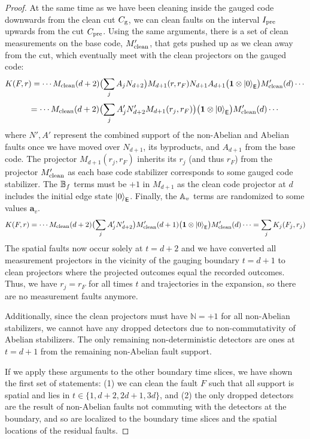 \documentclass[11pt]{article}
\begin{document}
\begin{proof}
    At the same time as we have been cleaning inside the gauged code downwards from the clean cut $C_{\rm g}$, we can clean faults on the interval $I_{\rm pre}$ upwards from the cut $C_{\rm pre}$. Using the same arguments, there is a set of clean measurements on the base code, $M'_{\rm clean}$, that gets pushed up as we clean away from the cut, which eventually meet with the clean projectors on the gauged code:
    \[
    K(F, r) = \cdots M_{\rm clean}(d+2) \bigl ( \sum_j A_j N_{d+2} \bigr ) M_{d+1}(r, r_F) N_{d+1} A_{d+1} \bigl ( \mathbf{1} \otimes \ket{0}_{\mathsf{E}}  \bigr ) M'_{\rm clean}(d) \cdots 
    \]
    \[
    = \cdots M_{\rm clean}(d+2) \bigl ( \sum_j A'_j N'_{d+2} M_{d+1}(r_j, r_F) \bigr ) \bigl ( \mathbf{1} \otimes \ket{0}_{\mathsf{E}}  \bigr ) M'_{\rm clean}(d) \cdots 
    \]
    where $N', A'$ represent the combined support of the non-Abelian and Abelian faults once we have moved over $N_{d+1}$, its byproducts, and $A_{d+1}$ from the base code. The projector $M_{d+1}(r_j, r_F)$ inherits its $r_j$ (and thus $r_F$) from the projector $M'_{\rm clean}$ as each base code stabilizer corresponds to some gauged code stabilizer. The $\mathbb{B}_f$ terms must be $+1$ in $M_{d+1}$ as the clean code projector at $d$ includes the initial edge state $\ket{0}_{\mathsf{E}}$. Finally, the $\mathbb{A}_v$ terms are randomized to some values $\bm a_v$.
    \[
    K(F, r) = \cdots M_{\rm clean}(d+2) \bigl ( \sum_j A'_j N'_{d+2} \bigr ) M'_{\rm clean}(d+1) \bigl ( \mathbf{1} \otimes \ket{0}_{\mathsf{E}}  \bigr ) M'_{\rm clean}(d) \cdots = \sum_j K_j(F_j, r_j) 
    \]
    The spatial faults now occur solely at $t = d+2$ and we have converted all measurement projectors in the vicinity of the gauging boundary $t=d+1$ to clean projectors where the projected outcomes equal the recorded outcomes. Thus, we have $r_j = r_F$ for all times $t$ and trajectories in the expansion, so there are no measurement faults anymore. 

    Additionally, since the clean projectors must have $\mathbb{N} = +1$ for all non-Abelian stabilizers, we cannot have any dropped detectors due to non-commutativity of Abelian stabilizers. The only remaining non-deterministic detectors are ones at $t=d+1$ from the remaining non-Abelian fault support.

    If we apply these arguments to the other boundary time slices, we have shown the first set of statements: (1) we can clean the fault $F$ such that all support is spatial and lies in $t \in \{1, d+2, 2d+1, 3d\}$, and (2) the only dropped detectors are the result of non-Abelian faults not commuting with the detectors at the boundary, and so are localized to the boundary time slices and the spatial locations of the residual faults. 


\end{proof}
\end{document}
